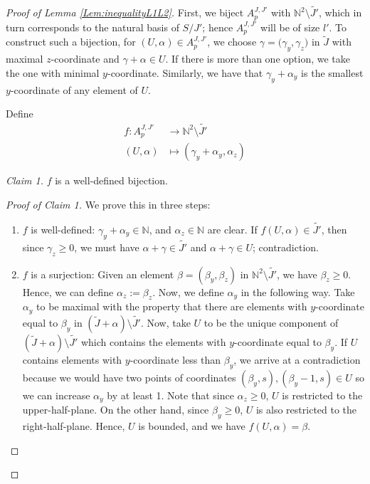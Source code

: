 \documentclass[10pt,a4paper]{amsart}
\newcommand{\BN}{{\mathbb{N}}}
\begin{document}
\begin{proof}[Proof of Lemma \ref{Lem:inequalityL1L2}]
 
First, we biject $A^{J,J'}_p$ with $\mathbb{N}^2\setminus\tilde{J'}$, which in turn corresponds to the natural basis of $S/J'$; hence $A^{J,J'}_p$ will be of
size $l'$. To construct such a bijection,  for $(U,\alpha)\in A^{J,J'}_p$, we choose  $\gamma={(\gamma_y,\gamma_z})$ in $\tilde{J}$ with maximal $z$-coordinate and $\gamma+\alpha\in U$. If there is more than one option, we take the one with minimal $y$-coordinate. Similarly, we have that $\gamma_y+\alpha_y$ is the smallest $y$-coordinate of any element of $U$.

Define
\begin{align*}
    f:A^{J,J'}_p&\rightarrow \mathbb{N}^2\setminus\tilde{J'}\\
    (U,\alpha)&\mapsto(\gamma_y+\alpha_y,\alpha_z)
\end{align*}




\emph{Claim 1.} $f$ is a well-defined bijection.
\begin{proof}[Proof of Claim 1] We prove this in three steps:


\begin{enumerate}
    \item $f$ is well-defined: $\gamma_y+\alpha_y\in\BN$, and $\alpha_z\in \BN$ are clear. If $f(U,\alpha)\in\tilde{J'}$, then since $\gamma_z\geq0$, we must have $\alpha+\gamma\in\tilde{J'}$ and $\alpha+\gamma\in U$; contradiction.
    


     \item $f$ is a surjection: Given an element $\beta=(\beta_y,\beta_z)$ in $\mathbb{N}^2\setminus\tilde{J'}$, we have $\beta_z\geq 0$. Hence, we can define $\alpha_z:=\beta_z$. Now, we define $\alpha_y$ in the following way. Take $\alpha_y$ to be maximal with the property that there are elements with $y$-coordinate equal to $\beta_y$ in $(\tilde{J}+\alpha)\setminus\tilde{J'}$. Now, take $U$ to be the unique component of $(\tilde{J}+\alpha)\setminus\tilde{J'}$ which contains the elements with  $y$-coordinate equal to $\beta_y$. If $U$ contains elements with $y$-coordinate less than $\beta_y$, we arrive at a contradiction because we would have two points of coordinates $(\beta_y,s),(\beta_y-1,s)\in U$ so we can increase $\alpha_y$ by at least 1. Note that since $\alpha_z\geq 0$, $U$ is restricted to the upper-half-plane. On the other hand, since  $\beta_y\geq 0$, $U$ is also restricted to the right-half-plane. Hence, $U$ is bounded, and we have $f(U,\alpha)=\beta$.


\end{enumerate}
\end{proof}
\end{proof}
\end{document}
